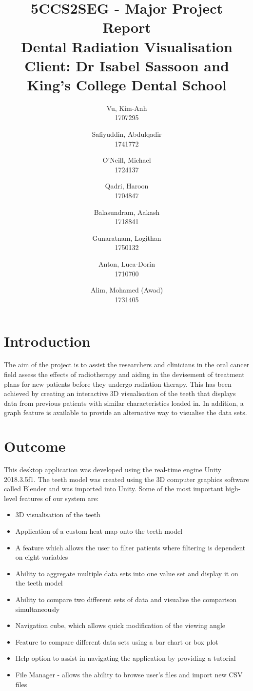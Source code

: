 \documentclass[11pt,english, titlepage]{article}
\author{
  Vu, Kim-Anh\\
  {1707295}
  \and
  Safiyuddin, Abdulqadir\\
  {1741772}
  \and
  O'Neill, Michael\\
  {1724137}
  \and
  Qadri, Haroon\\
  {1704847}
  \and
  Balasundram, Aakash\\
  {1718841}
  \and
  Gunaratnam, Logithan\\
  {1750132}
  \and
  Anton, Luca-Dorin\\
  {1710700}
  \and
  Alim, Mohamed (Awad)\\
  {1731405}
}
\title
{
5CCS2SEG - Major Project Report \\
\large Dental Radiation Visualisation \\
\large Client: Dr Isabel Sassoon and King's College Dental School
}
\date{}
\begin{document}
  \maketitle

  \section*{Introduction}
  The aim of the project is to assist the researchers and clinicians in the oral cancer field assess the effects of radiotherapy and aiding in the devisement of treatment plans for new patients before they undergo radiation therapy. This has been achieved by creating an interactive 3D visualisation of the teeth that displays data from previous patients with similar characteristics loaded in. In addition, a graph feature is available to provide an alternative way to visualise the data sets.

  \section*{Outcome}
  This desktop application was developed using the real-time engine Unity 2018.3.5f1. The teeth model was created using the 3D computer graphics software called Blender and was imported into Unity.  Some of the most important high-level features of our system are:

    \begin{itemize}
      \item 3D visualisation of the teeth
      \item Application of a custom heat map onto the teeth model
      \item A feature which allows the user to filter patients where filtering is dependent on eight variables
      \item Ability to aggregate multiple data sets into one value set and display it on the teeth model
      \item Ability to compare two different sets of data and visualise the comparison simultaneously
      \item Navigation cube, which allows quick modification of the viewing angle
      \item Feature to compare different data sets using a bar chart or box plot
      \item Help option to assist in navigating the application by providing a tutorial
      \item File Manager - allows the ability to browse user's files and import new CSV files
    \end{itemize}
\end{document}
